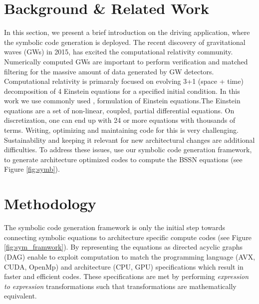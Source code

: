 \documentclass[sigconf,]{acmart}
\begin{document}
\section{Background \& Related Work}
In this section, we present a brief introduction on the driving application, where the symbolic code generation is deployed. The recent discovery of gravitational waves (GWs) in 2015, has excited the computational relativity community. Numerically computed GWs are important to perform verification and matched filtering for the massive amount of data generated by GW detectors. Computational relativity is primaraly focused on evolving 3+1 (space + time) decomposition of 4 Einstein equations for a specified initial condition. In this work we use commonly used \BSSN, formulation of Einstein equations.The Einstein equations are a set of non-linear, coupled, partial differential equations. On discretization, one can end up with 24 or more equations with thousands of terms. Writing, optimizing and maintaining  code for this is very challenging. Sustainability and keeping it relevant for new  architectural changes are additional difficulties. To address these issues, use our symbolic code generation framework, to generate architecture optimized codes to compute the BSSN equations (see Figure \ref{fig:symb}).  

\section{Methodology}

The symbolic code generation framework is only the initial step towards connecting symbolic equations to architecture specific compute codes (see Figure \ref{fig:sym_framwork}). By representing the equations as directed acyclic graphs (DAG) enable to exploit computation to match the programming language (AVX, CUDA, OpenMp) and architecture (CPU, GPU) specifications which result in faster and efficient codes. These specifications are met by performing \textit{expression to expression} transformations such that transformations are mathematically equivalent. 
\end{document}
